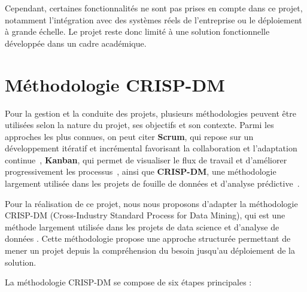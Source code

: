 \documentclass[12pt,a4paper,oneside]{report}
\begin{document}
Cependant, certaines fonctionnalités ne sont pas prises en compte dans ce projet, notamment l’intégration avec des systèmes réels de l’entreprise ou le déploiement à grande échelle. Le projet reste donc limité à une solution fonctionnelle développée dans un cadre académique.
\section{Méthodologie CRISP-DM}
Pour la gestion et la conduite des projets, plusieurs méthodologies peuvent être utilisées selon la nature du projet, ses objectifs et son contexte. Parmi les approches les plus connues, on peut citer \textbf{Scrum}, qui repose sur un développement itératif et incrémental favorisant la collaboration et l’adaptation continue~\cite{scrumguide2020}, \textbf{Kanban}, qui permet de visualiser le flux de travail et d’améliorer progressivement les processus~\cite{kanbananderson2010}, ainsi que \textbf{CRISP-DM}, une méthodologie largement utilisée dans les projets de fouille de données et d’analyse prédictive~\cite{crispdm}.

Pour la réalisation de ce projet, nous nous proposons d'adapter la méthodologie CRISP-DM (Cross-Industry Standard Process for Data Mining), qui est une méthode largement utilisée dans les projets de data science et d’analyse de données \cite{crispdm}. Cette méthodologie propose une approche structurée permettant de mener un projet depuis la compréhension du besoin jusqu’au déploiement de la solution.

La méthodologie CRISP-DM se compose de six étapes principales :
\end{document}
